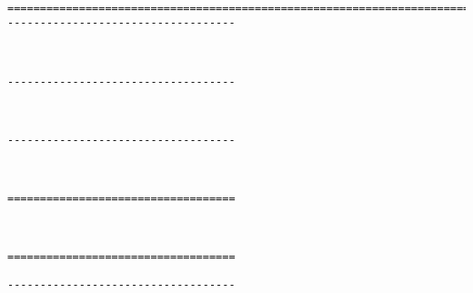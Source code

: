 \







\goodbreak
{}

\goodbreak \begin{samepage} \small \begin{verbatim}
================================================================================
-----------------------------------
\end{verbatim} \normalsize \end{samepage}

\

\goodbreak \begin{samepage} \small \begin{verbatim}
-----------------------------------
\end{verbatim} \normalsize \end{samepage}

\

\goodbreak \begin{samepage} \small \begin{verbatim}
-----------------------------------
\end{verbatim} \normalsize \end{samepage}

\

\goodbreak \begin{samepage} \small \begin{verbatim}
===================================
\end{verbatim} \normalsize \end{samepage}

\

\goodbreak \begin{samepage} \small \begin{verbatim}
===================================
\end{verbatim} \end{samepage} \goodbreak \begin{samepage} \begin{verbatim}
-----------------------------------
\end{verbatim} \normalsize \end{samepage}

